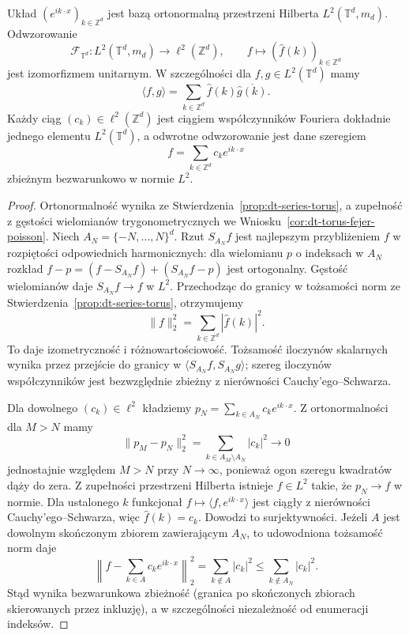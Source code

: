 \begin{twierdzenie}
\label{thm:dt-torus-riesz-fischer}
Układ $(e^{ik\cdot x})_{k\in\mathbb Z^d}$
jest bazą ortonormalną przestrzeni Hilberta
$L^2(\mathbb T^d,m_d)$.
Odwzorowanie
\[
 \mathcal F_{\mathbb T^d}: L^2(\mathbb T^d,m_d)
 \longrightarrow\ell^2(\mathbb Z^d),\qquad
 f\longmapsto(\widehat f(k))_{k\in\mathbb Z^d}
\]
jest izomorfizmem unitarnym. W szczególności
dla $f,g\in L^2(\mathbb T^d)$ mamy
\[
 \langle f,g\rangle=
 \sum_{k\in\mathbb Z^d}\widehat f(k)
 \overline{\widehat g(k)}.
\]
Każdy ciąg $(c_k)\in\ell^2(\mathbb Z^d)$
jest ciągiem współczynników Fouriera dokładnie
jednego elementu $L^2(\mathbb T^d)$, a odwrotne
odwzorowanie jest dane szeregiem
\[
 f=\sum_{k\in\mathbb Z^d}c_ke^{ik\cdot x}
\]
zbieżnym bezwarunkowo w normie $L^2$.
\end{twierdzenie}
\begin{proof}
Ortonormalność wynika ze
Stwierdzenia~\ref{prop:dt-series-torus},
a zupełność z gęstości wielomianów trygonometrycznych
we Wniosku~\ref{cor:dt-torus-fejer-poisson}.
Niech $A_N=\{-N,\ldots,N\}^d$.
Rzut $S_{A_N}f$ jest najlepszym przybliżeniem
$f$ w rozpiętości odpowiednich harmonicznych:
dla wielomianu $p$ o indeksach w $A_N$
rozkład $f-p=(f-S_{A_N}f)+(S_{A_N}f-p)$
jest ortogonalny. Gęstość wielomianów daje
$S_{A_N}f\to f$ w $L^2$. Przechodząc do granicy
w tożsamości norm ze
Stwierdzenia~\ref{prop:dt-series-torus},
otrzymujemy
\[
 \|f\|_2^2=\sum_{k\in\mathbb Z^d}|\widehat f(k)|^2.
\]
To daje izometryczność i różnowartościowość.
Tożsamość iloczynów skalarnych wynika przez
przejście do granicy w
$\langle S_{A_N}f,S_{A_N}g\rangle$;
szereg iloczynów współczynników jest bezwzględnie
zbieżny z nierówności Cauchy'ego--Schwarza.

Dla dowolnego $(c_k)\in\ell^2$ kładziemy
$p_N=\sum_{k\in A_N}c_ke^{ik\cdot x}$.
Z ortonormalności dla $M>N$ mamy
\[
 \|p_M-p_N\|_2^2=\sum_{k\in A_M\setminus A_N}|c_k|^2
 \longrightarrow0
\]
jednostajnie względem $M>N$ przy $N\to\infty$,
ponieważ ogon szeregu kwadratów dąży do zera.
Z zupełności przestrzeni Hilberta istnieje
$f\in L^2$ takie, że $p_N\to f$ w normie.
Dla ustalonego $k$ funkcjonał
$f\mapsto\langle f,e^{ik\cdot x}\rangle$ jest ciągły
z nierówności Cauchy'ego--Schwarza, więc
$\widehat f(k)=c_k$. Dowodzi to surjektywności.
Jeżeli $A$ jest dowolnym skończonym zbiorem
zawierającym $A_N$, to udowodniona tożsamość norm
daje
\[
 \left\|f-\sum_{k\in A}c_ke^{ik\cdot x}\right\|_2^2
 =\sum_{k\notin A}|c_k|^2
 \le\sum_{k\notin A_N}|c_k|^2.
\]
Stąd wynika bezwarunkowa zbieżność (granica
po skończonych zbiorach skierowanych przez inkluzję),
a w szczególności niezależność od enumeracji indeksów.
\end{proof}

